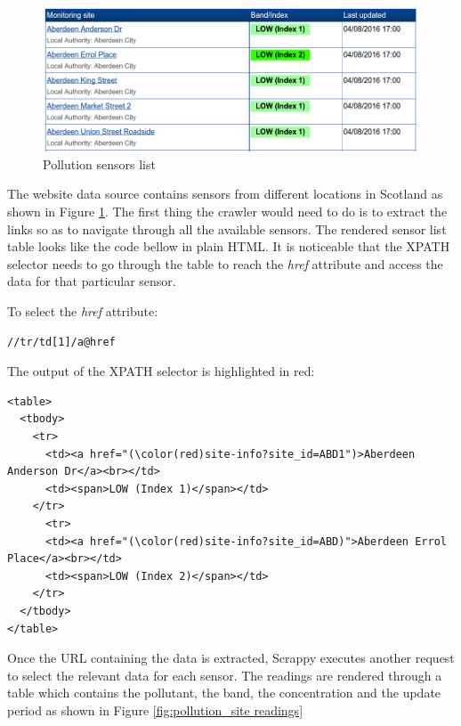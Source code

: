 \begin{figure}[H]
\begin{adjustbox}{width=.5\textwidth,center=\textwidth}
  \centering
  \includegraphics[scale=1]{images/monitoring_summary.png}
\end{adjustbox}
  \caption[Pollution sensors list]{Pollution sensors list \footnotemark}
  \label{fig:pollution_sensors_list}
\end{figure}

The website data source contains sensors from different locations in Scotland as shown in Figure \ref{fig:pollution_sensors_list}. The first thing the crawler would need to do is to extract the links so as to navigate through all the available sensors. The rendered sensor list table looks like the code bellow in plain HTML. It is noticeable that the XPATH selector needs to go through the table to reach the \textit{href} attribute and access the data for that particular sensor.

To select the \textit{href} attribute: \bigskip

{\centering
\begin{BVerbatim}
//tr/td[1]/a@href
\end{BVerbatim}
\par
}\bigskip

The output of the XPATH selector is highlighted in red: 

\begin{Verbatim}[fontsize=\small,commandchars=\\\(\)]
<table>
  <tbody>
    <tr>
      <td><a href="(\color(red)site-info?site_id=ABD1")>Aberdeen Anderson Dr</a><br></td>
      <td><span>LOW (Index 1)</span></td>
    </tr>
      <tr>
      <td><a href="(\color(red)site-info?site_id=ABD)">Aberdeen Errol Place</a><br></td>
      <td><span>LOW (Index 2)</span></td>
    </tr>
  </tbody>
</table>
\end{Verbatim}

Once the URL containing the data is extracted, Scrappy executes another request to select the relevant data for each sensor. The readings are rendered through a table which contains the pollutant, the band, the concentration and the update period as shown in Figure \ref{fig:pollution_site readings}

